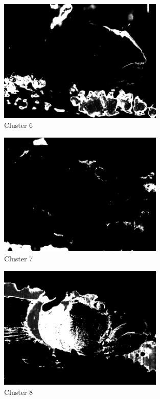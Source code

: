 \documentclass{article}      %
\begin{document}
\begin{figure}[H]
\centering
\includegraphics[width=0.7\textwidth]{partc_wts_cluster5}
\caption{Cluster 6}
\end{figure}

\begin{figure}[H]
\centering
\includegraphics[width=0.7\textwidth]{partc_wts_cluster6}
\caption{Cluster 7}
\end{figure}

\begin{figure}[H]
\centering
\includegraphics[width=0.7\textwidth]{partc_wts_cluster7}
\caption{Cluster 8}
\end{figure}
\end{document}
